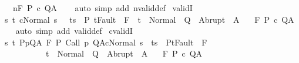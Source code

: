 \begin{isabellebody}
\ \ {\isasymLongrightarrow}\ {\isasymGamma}{\isasymTurnstile}n{\isacharcolon}\isactrlbsub {\isacharslash}F\isactrlesub \ P\ c\ Q{\isacharcomma}A{\isachardoublequoteclose}\isanewline
%
\isadelimproof
\ \ %
\endisadelimproof
%
\isatagproof
{}\isamarkupfalse%
\ {\isacharparenleft}auto\ simp\ add{\isacharcolon}\ nvalid{\isacharunderscore}def{\isacharparenright}%
\endisatagproof
{\isafoldproof}%
%
\isadelimproof
\isanewline
%
\endisadelimproof
\isanewline
{}\isamarkupfalse%
\ validI{\isacharcolon}\ \isanewline
\ {\isachardoublequoteopen}{\isasymlbrakk}{\isasymAnd}s\ t{\isachardot}\ {\isasymlbrakk}{\isasymGamma}{\isasymturnstile}{\isasymlangle}c{\isacharcomma}Normal\ s\ {\isasymrangle}\ {\isasymRightarrow}\ t{\isacharsemicolon}s\ {\isasymin}\ P{\isacharsemicolon}\ t{\isasymnotin}Fault\ {\isacharbackquote}\ F{\isasymrbrakk}\ {\isasymLongrightarrow}\ t\ {\isasymin}\ Normal\ {\isacharbackquote}\ Q\ {\isasymunion}\ Abrupt\ {\isacharbackquote}\ A{\isasymrbrakk}\isanewline
\ \ {\isasymLongrightarrow}\ {\isasymGamma}{\isasymTurnstile}\isactrlbsub {\isacharslash}F\isactrlesub \ P\ c\ Q{\isacharcomma}A{\isachardoublequoteclose}\isanewline
%
\isadelimproof
\ \ %
\endisadelimproof
%
\isatagproof
{}\isamarkupfalse%
\ {\isacharparenleft}auto\ simp\ add{\isacharcolon}\ valid{\isacharunderscore}def{\isacharparenright}%
\endisatagproof
{\isafoldproof}%
%
\isadelimproof
\isanewline
%
\endisadelimproof
\isanewline
{}\isamarkupfalse%
\ cvalidI{\isacharcolon}\ \isanewline
\ {\isachardoublequoteopen}{\isasymlbrakk}{\isasymAnd}s\ t{\isachardot}\ {\isasymlbrakk}{\isasymforall}{\isacharparenleft}P{\isacharcomma}p{\isacharcomma}Q{\isacharcomma}A{\isacharparenright}{\isasymin}{\isasymTheta}{\isachardot}\ {\isasymGamma}{\isasymTurnstile}\isactrlbsub {\isacharslash}F\isactrlesub \ P\ {\isacharparenleft}Call\ p{\isacharparenright}\ Q{\isacharcomma}A{\isacharsemicolon}{\isasymGamma}{\isasymturnstile}{\isasymlangle}c{\isacharcomma}Normal\ s{\isasymrangle}\ {\isasymRightarrow}\ t{\isacharsemicolon}s\ {\isasymin}\ P{\isacharsemicolon}t{\isasymnotin}Fault\ {\isacharbackquote}\ F{\isasymrbrakk}\ \isanewline
\ \ \ \ \ \ \ \ \ \ {\isasymLongrightarrow}\ t\ {\isasymin}\ Normal\ {\isacharbackquote}\ Q\ {\isasymunion}\ Abrupt\ {\isacharbackquote}\ A{\isasymrbrakk}\isanewline
\ \ {\isasymLongrightarrow}\ {\isasymGamma}{\isacharcomma}{\isasymTheta}{\isasymTurnstile}\isactrlbsub {\isacharslash}F\isactrlesub \ P\ c\ Q{\isacharcomma}A{\isachardoublequoteclose}\isanewline
%
\isadelimproof
\ \ %
\endisadelimproof
%
\isatagproof
{}\isamarkupfalse%

\end{isabellebody}

